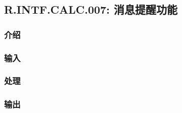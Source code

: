 \subsection{R.INTF.CALC.007: 消息提醒功能}
\subsubsection{介绍}
\subsubsection{输入}
\subsubsection{处理}
\subsubsection{输出}